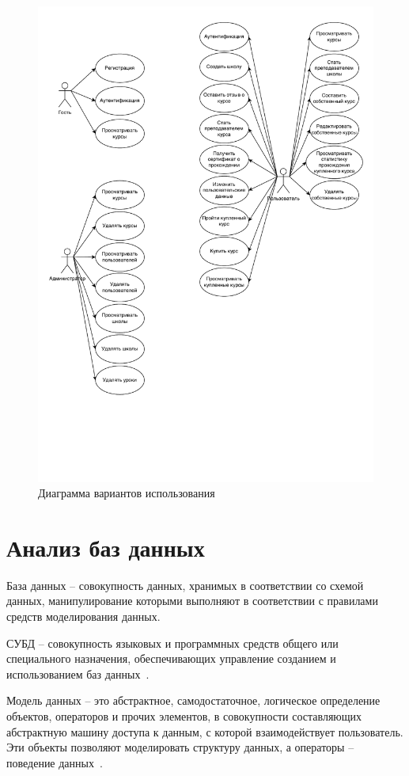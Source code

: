 \begin{figure}[H]
	\centering
	\includegraphics[height=0.35\textheight]{inc/img/usecase.pdf}
	\caption{Диаграмма вариантов использования}
	\label{img:usecase}
\end{figure}

\section{Анализ баз данных}
База данных -- совокупность данных, хранимых в соответствии со схемой данных, манипулирование которыми выполняют в соответствии с правилами средств моделирования данных.

СУБД -- совокупность языковых и программных средств общего или специального назначения, обеспечивающих управление созданием и использованием баз данных~\cite{williams}.

Модель данных -- это абстрактное, самодостаточное, логическое определение объектов, операторов и прочих элементов, в совокупности составляющих абстрактную машину доступа к данным, с которой взаимодействует пользователь. Эти объекты позволяют моделировать структуру данных, а операторы -- поведение данных~\cite{williams}.

